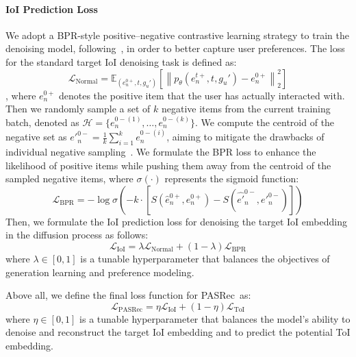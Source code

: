 \documentclass[sigconf,nonacm]{acmart}
\newcommand{\modelname}{PASRec}
\begin{document}
\paragraph{IoI Prediction Loss}
We adopt a BPR-style positive–negative contrastive learning strategy to train the denoising model, following~\cite{liu2024preference}, in order to better capture user preferences. The loss for the standard target IoI denoising task is defined as:
\begin{equation}
\label{equation_Lnormal}
\mathcal{L}_{\text{Normal}} = \mathbb{E}_{({e}_{n}^{0+}, t, {g}_u')} \left[ \left\| p_{\theta}({e}_{n}^{t+}, t, {g}_u') - {e}_{n}^{0+} \right\|_2^2 \right]
\end{equation}
, where \( {e}_{n}^{0+} \) denotes the positive item that the user has actually interacted with. Then we randomly sample a set of \( k \) negative items from the current training batch, denoted as \( \mathcal{H} = \{{e}_{n}^{0-(1)},  \dots, {e}_{n}^{0-(k)}\} \). We compute the centroid of the negative set as \( {{e'}}_{n}^{0-} = \frac{1}{k} \sum_{i=1}^{k} {e}_{n}^{0-(i)} \), aiming to mitigate the drawbacks of individual negative sampling~\cite{liu2024preference}. We formulate the BPR loss to enhance the likelihood of positive items while pushing them away from the centroid of the sampled negative items, where \( \sigma(\cdot) \) represents the sigmoid function:
\begin{equation}
\label{equation_LBPR}
\mathcal{L}_{\text{BPR}} = -\log \sigma \left( -k \cdot \left[ S(\hat{{e}}_{n}^{0+}, {e}_{n}^{0+}) - S(\hat{{e'}}_{n}^{0-}, {{e'}}_{n}^{0-}) \right] \right)
\end{equation} 
Then, we formulate the IoI prediction loss for denoising the target IoI embedding in the diffusion process as follows:
\begin{equation}
\label{equation_LDiff}
\mathcal{L}_{\text{IoI}} = \lambda \mathcal{L}_{\text{Normal}} + (1 - \lambda)\mathcal{L}_{\text{BPR}}
\end{equation}
where \( \lambda \in [0,1] \) is a tunable hyperparameter that balances the objectives of generation learning and preference modeling.

Above all, we define the final loss function for \modelname\ as:
\begin{equation}
\label{equation_LTAGDiff}
\mathcal{L}_{\text{\modelname}} = \eta \mathcal{L}_{\text{IoI}} + (1 - \eta)\mathcal{L}_{\text{ToI}}
\end{equation}
where \( \eta \in [0,1] \) is a tunable hyperparameter that balances the model's ability to denoise and reconstruct the target IoI embedding and to predict the potential ToI embedding.
\end{document}
